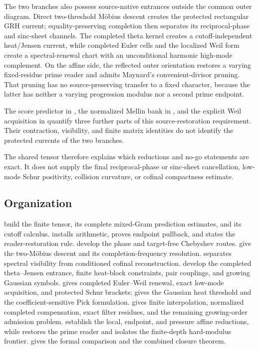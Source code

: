 \documentclass[11pt]{article}
\theoremstyle{definition}
\theoremstyle{remark}
\begin{document}
The two branches also possess source-native entrances outside the common
outer diagram.  Direct two-threshold M\"obius descent creates the protected
rectangular GRH current; equality-preserving completion then separates its
reciprocal-phase and sinc-sheet channels.  The completed theta kernel creates
a cutoff-independent heat/Jensen current, while completed Euler cells and the
localized Weil form create a spectral-renewal chart with an unconditional
harmonic high-mode complement.  On the affine side, the reflected outer
orientation restores a varying fixed-residue prime reader and admits
Maynard's convenient-divisor pruning.  That pruning has no source-preserving
transfer to a fixed character, because the latter has neither a varying
progression modulus nor a second prime endpoint.

The score predictor in , the normalized Mellin
bank in , and the explicit Weil acquisition in
 quantify three further parts of this
source-restoration requirement.  Their contraction, visibility, and finite
matrix identities do not identify the protected currents of the two branches.

The shared tensor therefore explains which reductions and no-go statements
are exact.  It does not supply the final reciprocal-phase or sinc-sheet
cancellation, low-mode Schur positivity, collision curvature, or cofinal
compactness estimate.

\subsection{Organization}

build the finite tensor, its complete mixed-Gram prediction estimates, and
its cutoff calculus.   installs arithmetic,
proves endpoint pullback, and states the reader-restoration rule.
 develop the phase and
target-free Chebyshev routes.  
give the two-M\"obius descent and its completion-frequency resolution.
 separates spectral visibility from conditioned
cofinal reconstruction.  
develop the completed theta--Jensen entrance, finite heat-block
constraints, pair couplings, and growing Gaussian symbols.   gives completed Euler--Weil renewal,
exact low-mode acquisition, and protected Schur brackets;
 gives the Gaussian heat threshold and the
coefficient-sensitive Pick formulation.
 gives finite interpolation,
normalized completed compensation, exact filter residues, and the
remaining growing-order admission problem.
establish the local, endpoint, and pressure affine reductions, while
 restores the prime reader and isolates the
finite-depth hard-modulus frontier.   gives the
formal comparison and the combined closure theorem.
\end{document}
